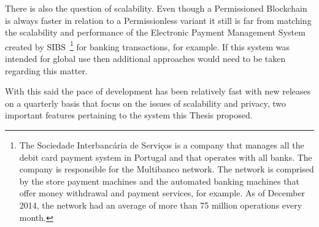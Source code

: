 There is also the question of scalability. Even though a Permissioned Blockchain
is always faster in relation to a Permissionless variant it still is far from
matching the scalability and performance of the Electronic Payment Management
System created by SIBS~\footnote{The Sociedade Interbancária de Serviços is a
company that manages all the debit card payment system in Portugal and that
operates with all banks. The company is responsible for the Multibanco network.
The network is comprised by the store payment machines and the automated
banking machines that offer money withdrawal and payment services, for example.
As of December 2014, the network had an average of more than 75 million
operations every month.} for banking transactions, for example. If this system
was intended for global use then additional approaches would need to be taken
regarding this matter.

With this said the pace of development has been relatively fast with new
releases on a quarterly basis that focus on the issues of scalability and
privacy, two important features pertaining to the system this Thesis proposed.
